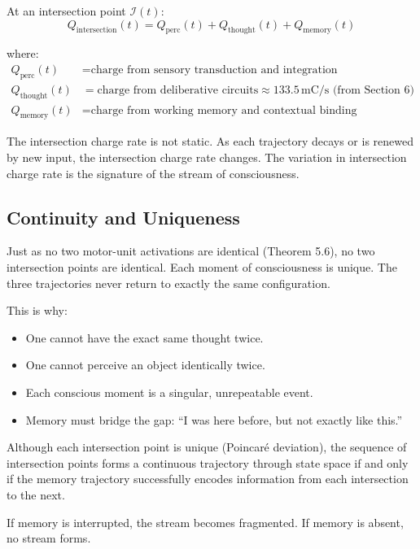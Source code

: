 \begin{definition}
At an intersection point $\mathcal{I}(t)$:
\begin{equation}
Q_{\text{intersection}}(t) = Q_{\text{perc}}(t) + Q_{\text{thought}}(t) + Q_{\text{memory}}(t)
\end{equation}

where:
\begin{align}
Q_{\text{perc}}(t) &= \text{charge from sensory transduction and integration} \\
Q_{\text{thought}}(t) &= \text{charge from deliberative circuits} \approx 133.5\,\text{mC/s (from Section 6)} \\
Q_{\text{memory}}(t) &= \text{charge from working memory and contextual binding}
\end{align}
\end{definition}

The intersection charge rate is not static. As each trajectory decays or is renewed by new input, the intersection charge rate changes. The variation in intersection charge rate is the signature of the stream of consciousness.

\subsection{Continuity and Uniqueness}

\begin{proposition}
Just as no two motor-unit activations are identical (Theorem 5.6), no two intersection points are identical. Each moment of consciousness is unique. The three trajectories never return to exactly the same configuration.

This is why:
\begin{itemize}
\item One cannot have the exact same thought twice.
\item One cannot perceive an object identically twice.
\item Each conscious moment is a singular, unrepeatable event.
\item Memory must bridge the gap: ``I was here before, but not exactly like this.''
\end{itemize}
\end{proposition}

\begin{proposition}
Although each intersection point is unique (Poincaré deviation), the sequence of intersection points forms a continuous trajectory through state space if and only if the memory trajectory successfully encodes information from each intersection to the next.

If memory is interrupted, the stream becomes fragmented. If memory is absent, no stream forms.
\end{proposition}

